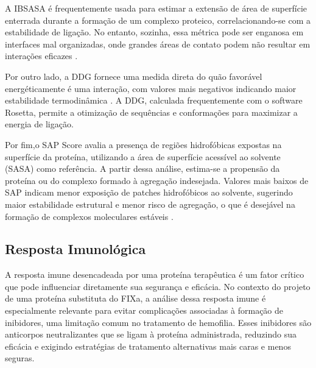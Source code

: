 A IBSASA é frequentemente usada para estimar a extensão de área de superfície enterrada durante a formação de um complexo proteico,
correlacionando-se com a estabilidade de ligação. 
No entanto, sozinha, essa métrica pode ser enganosa em interfaces mal organizadas, 
onde grandes áreas de contato podem não resultar em interações eficazes \cite{Docking}. 

Por outro lado, a DDG fornece uma medida direta do quão favorável energéticamente é uma interação,
com valores mais negativos indicando maior estabilidade termodinâmica \cite{Docking}. 
A DDG, calculada frequentemente com o software Rosetta, 
permite a otimização de sequências e conformações para maximizar a energia de ligação.

Por fim,o SAP Score avalia a presença de regiões hidrofóbicas expostas na superfície da proteína, 
utilizando a área de superfície acessível ao solvente (SASA) como referência. 
A partir dessa análise, estima-se a propensão da proteína ou do complexo formado à agregação indesejada.
Valores mais baixos de SAP indicam menor exposição de patches hidrofóbicos ao solvente,
sugerindo maior estabilidade estrutural e menor risco de agregação, o que é desejável na formação de complexos moleculares estáveis
\cite{Docking}.





\subsection{Resposta Imunológica}
\label{subsection:RespImuno} 

A resposta imune desencadeada por uma proteína terapêutica é um fator crítico que pode influenciar diretamente sua segurança e eficácia. 
No contexto do projeto de uma proteína substituta do FIXa,
a análise dessa resposta imune é especialmente relevante para evitar complicações associadas à formação de inibidores,
uma limitação comum no tratamento de hemofilia. 
Esses inibidores são anticorpos neutralizantes que se ligam à proteína administrada,
reduzindo sua eficácia e exigindo estratégias de tratamento alternativas mais caras e menos seguras.

